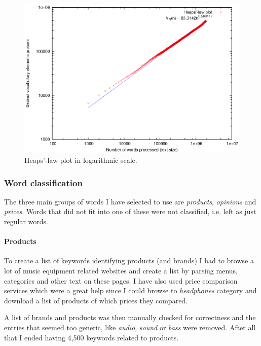       \begin{figure}[H]
        \centering
        \includegraphics[width=\textwidth]{chapters/03_implementation/extraction_log}
        \caption{Heaps'-law plot in logarithmic scale.}
        \label{fig:word_extraction_log}
      \end{figure}


    \subsubsection{Word classification}
    
      The three main groups of words I have selected to use are \emph{products}, \emph{opinions} and \emph{prices}. Words that did not fit into one of these were not classified, i.e. left as just regular words.
    
      \paragraph{Products}
      
        To create a list of keywords identifying products (and brands) I had to browse a lot of music equipment related websites and create a list by parsing menus, categories and other text on these pages. I have also used price comparison services which were a great help since I could browse to \emph{headphones} category and download a list of products of which prices they compared.
        
        A list of brands and products was then manually checked for correctness and the entries that seemed too generic, like \emph{audio}, \emph{sound} or \emph{bass} were removed. After all that I ended having 4,500 keywords related to products.
      
